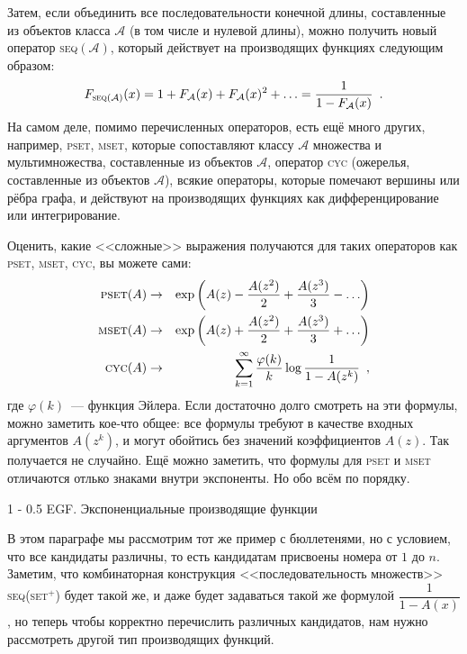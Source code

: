 \documentclass{article}
\makeatletter
\theoremstyle{definition}
\renewcommand{\section}{\@startsection
{section}%
{1}%
{\z@}%
{-\baselineskip}%
{0.5\baselineskip}%
{\centering\large\scshape}} %
\makeatother
\begin{document}
Затем, если объединить все последовательности конечной длины, составленные из 
объектов класса \( \mathcal A \) (в том числе и 
нулевой длины), можно получить новый оператор \textsc{seq}\( (\mathcal A) \), 
который действует 
на производящих функциях следующим образом:
\[
	F_{\text{\textsc{seq}}(\mathcal A)} (x) = 1 + F_{\mathcal A}(x) + 
	F_{\mathcal A}(x)^2 + \ldots = 
	\dfrac{1}{1 - F_{\mathcal A}(x)} \enspace .
\]
На самом деле, помимо перечисленных операторов, есть ещё много других, 
например, \textsc{pset}, \textsc{mset}, которые сопоставляют классу \( \mathcal 
A \) множества и 
мультимножества, составленные из объектов \( \mathcal A \), оператор 
\textsc{cyc} (ожерелья, составленные из объектов \( \mathcal A \)), всякие 
операторы, которые 
помечают вершины или рёбра графа, и действуют на производящих функциях как 
дифференцирование или интегрирование.

Оценить, какие <<сложные>> выражения получаются для таких операторов как 
\textsc{pset}, \textsc{mset}, \textsc{cyc}, вы можете сами:
\begin{eqnarray*}
	\text{\textsc{pset}}(A) & \to & \exp \left(
		A(z) - \dfrac{A(z^2)}{2} + \dfrac{A(z^3)}{3} - \ldots
	\right)\\
	\text{\textsc{mset}}(A) & \to & \exp \left(
		A(z) + \dfrac{A(z^2)}{2} + \dfrac{A(z^3)}{3} + \ldots
	\right)\\
	\text{\textsc{cyc}}(A) & \to & 
	\sum_{k=1}^{\infty} \dfrac{\varphi(k)}{k} \log \dfrac{1}{1 - A(z^k)} 
	\enspace ,
\end{eqnarray*}
где \( \varphi(k) \)~--- функция Эйлера. Если достаточно долго смотреть на эти 
формулы, можно заметить кое-что общее: все формулы требуют в качестве входных 
аргументов \( A(z^k) \), и могут обойтись без значений коэффициентов \( A(z) 
\). Так получается не случайно. Ещё можно заметить, что формулы для 
\textsc{pset} и \textsc{mset} 
отличаются отлько знаками внутри экспоненты.
Но обо всём по порядку.

\section{EGF. Экспоненциальные производящие 
	функции}

В этом параграфе мы рассмотрим тот же пример с бюллетенями, но с условием, что 
все кандидаты 
различны, то 
есть кандидатам присвоены номера от \( 1 \) до \( n \). Заметим, что 
комбинаторная конструкция <<последовательность множеств>> 
\textsc{seq}(\textsc{set}\( ^{+} \)) будет такой же, и 
даже будет задаваться такой же формулой \( \dfrac{1}{1 - A(x)} \), но теперь 
чтобы корректно перечислить различных кандидатов, нам 
нужно рассмотреть другой тип производящих функций.
\end{document}
